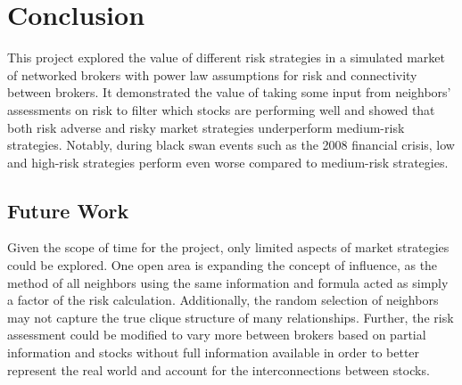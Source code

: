 \documentclass[letterpaper, 11 pt, proceedings]{IEEEtran}
\begin{document}
	
	\section{Conclusion}\label{sec:conclusion}
	This project explored the value of different risk strategies in a simulated market of networked brokers with power law assumptions for risk and connectivity between brokers. It demonstrated the value of taking some input from neighbors' assessments on risk to filter which stocks are performing well and showed that both risk adverse and risky market strategies underperform medium-risk strategies. Notably, during black swan events such as the 2008 financial crisis, low and high-risk strategies perform even worse compared to medium-risk strategies.
	
	\subsection{Future Work}\label{subsec:futurework}
	Given the scope of time for the project, only limited aspects of market strategies could be explored. One open area is expanding the concept of influence, as the method of all neighbors using the same information and formula acted as simply a factor of the risk calculation. Additionally, the random selection of neighbors may not capture the true clique structure of many relationships. Further, the risk assessment could be modified to vary more between brokers based on partial information and stocks without full information available in order to better represent the real world and account for the interconnections between stocks.
\end{document}
